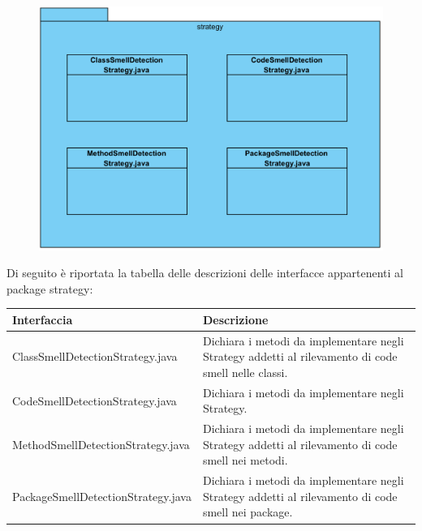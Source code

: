 \documentclass[11pt]{article}
\begin{document}
\begin{description}
				\item[ 2.1.1.2.9 Package strategy] 
				\item \begin{figure}[!h]
					\centering
					\includegraphics{diagrams/StrategyAnalysisPackageDiagram}
				\end{figure}
				Di seguito è riportata la tabella delle descrizioni delle interfacce appartenenti al package strategy:
				\item \begin{tabular}{|p{}|p{}|}
					\hline
					\textbf{Interfaccia} & \textbf{Descrizione}\\
					\hline
					ClassSmellDetectionStrategy.java & Dichiara i metodi da implementare negli Strategy addetti al rilevamento
					di code smell nelle classi. \\
					\hline
					CodeSmellDetectionStrategy.java & Dichiara i metodi da implementare negli Strategy. \\
					\hline
					MethodSmellDetectionStrategy.java & Dichiara i metodi da implementare negli Strategy addetti al rilevamento
					di code smell nei metodi. \\
					\hline
					PackageSmellDetectionStrategy.java & Dichiara i metodi da implementare negli Strategy addetti al rilevamento
					di code smell nei package. \\
					\hline
				\end{tabular}
			

\end{description}
\end{document}
